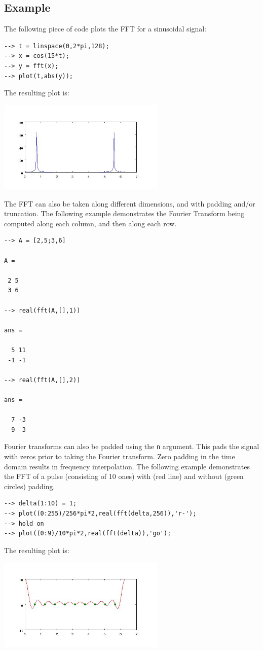 \subsection{Example}

The following piece of code plots the FFT for a sinusoidal signal:
\begin{verbatim}
--> t = linspace(0,2*pi,128);
--> x = cos(15*t);
--> y = fft(x);
--> plot(t,abs(y));
\end{verbatim}
The resulting plot is:


\centerline{\includegraphics[width=8cm]{fft1}}


The FFT can also be taken along different dimensions, and with padding 
and/or truncation.  The following example demonstrates the Fourier
Transform being computed along each column, and then along each row.
\begin{verbatim}
--> A = [2,5;3,6]

A = 

 2 5 
 3 6 

--> real(fft(A,[],1))

ans = 

  5 11 
 -1 -1 

--> real(fft(A,[],2))

ans = 

  7 -3 
  9 -3 
\end{verbatim}
Fourier transforms can also be padded using the \verb|n| argument.  This
pads the signal with zeros prior to taking the Fourier transform.  Zero
padding in the time domain results in frequency interpolation.  The
following example demonstrates the FFT of a pulse (consisting of 10 ones)
with (red line) and without (green circles) padding.
\begin{verbatim}
--> delta(1:10) = 1;
--> plot((0:255)/256*pi*2,real(fft(delta,256)),'r-');
--> hold on
--> plot((0:9)/10*pi*2,real(fft(delta)),'go');
\end{verbatim}
The resulting plot is:


\centerline{\includegraphics[width=8cm]{fft2}}

